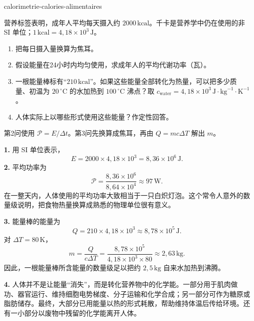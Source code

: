 \begin{exo}[食物热量与代谢功率]{calorimetrie-calories-alimentaires}

营养标签表明，成年人平均每天摄入约 $2000\,\text{kcal}$。千卡是营养学中仍在使用的非 SI 单位；$1\,\text{kcal}=4{,}18\times10^3\,\text{J}$。
\begin{enumerate}
  \item 把每日摄入量换算为焦耳。
  \item 假设能量在24小时内均匀使用，求成年人的平均代谢功率（瓦）。
  \item 一根能量棒标有“$210\,\text{kcal}$”。如果这些能量全部转化为热量，可以把多少质量、初温为 $20\,^\circ\text{C}$ 的水加热到 $100\,^\circ\text{C}$ 沸点？取 $c_{\text{water}}=4{,}18\times10^3\,\text{J}\!\cdot\!\text{kg}^{-1}\!\cdot\!\text{K}^{-1}$。
  \item 人体实际上以哪些形式使用这些能量？作定性回答。
\end{enumerate}
\begin{indication}
第2问使用 $\mathcal P=E/\Delta t$。第3问先换算成焦耳，再由 $Q=mc\Delta T$ 解出 $m$。
\end{indication}
\begin{solution}
\textbf{1.} 用 SI 单位表示，
\[
E=2000\times4{,}18\times10^3=8{,}36\times10^6\,\text{J}.
\]
\textbf{2.} 平均功率为
\[
\mathcal P=\frac{8{,}36\times10^6}{8{,}64\times10^4}\approx97\,\text{W}.
\]
在一整天内，人体使用的平均功率大致相当于一只白炽灯泡。这个常令人意外的数量级说明，把食物热量换算成熟悉的物理单位很有意义。

\textbf{3.} 能量棒的能量为
\[
Q=210\times4{,}18\times10^3\approx8{,}78\times10^5\,\text{J}.
\]
对 $\Delta T=80\,\text{K}$，
\[
m=\frac{Q}{c\Delta T}
=\frac{8{,}78\times10^5}{4{,}18\times10^3\times80}
\approx2{,}63\,\text{kg}.
\]
因此，一根能量棒所含能量的数量级足以把约 $2{,}5\,\text{kg}$ 自来水加热到沸腾。

\textbf{4.} 人体并不是让能量“消失”，而是转化营养物中的化学能。一部分用于肌肉做功、器官运行、维持细胞电势梯度、分子运输和化学合成；另一部分可作为糖原或脂肪储存。最终，大部分已用能量以热的形式耗散，帮助维持体温后传给环境。还有一小部分以废物中残留的化学能离开人体。
\end{solution}
\end{exo}
